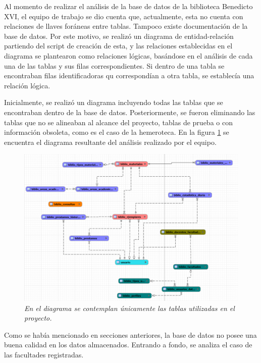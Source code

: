 \documentclass[spanish]{ieee_upb}
\begin{document}
Al momento de realizar el análisis de la base de datos de la biblioteca Benedicto XVI, el equipo de trabajo se dio cuenta que, actualmente, esta no cuenta con relaciones de llaves foráneas entre tablas. Tampoco existe documentación de la base de datos. Por este motivo, se realizó un diagrama de entidad-relación partiendo del script de creación de esta, y las relaciones establecidas en el diagrama se plantearon como relaciones lógicas, basándose en el análisis de cada una de las tablas y sus filas correspondientes. Si dentro de una tabla se encontraban filas identificadoras qu correspondían a otra tabla, se establecía una relación lógica.

\vspace{0.3cm}
Inicialmente, se realizó un diagrama incluyendo todas las tablas que se encontraban dentro de la base de datos. Posteriormente, se fueron eliminando las tablas que no se alineaban al alcance del proyecto, tablas de prueba o con información obsoleta, como es el caso de la hemeroteca. En la figura \ref{fig:entidad-relacion} se encuentra el diagrama resultante del análisis realizado por el equipo. 

\begin{figure}[H] 
	\centering
	\includegraphics[width=0.8\linewidth]{img/Diagramas/entidad-relacion.png}
	\vspace{-1mm}
	\caption[Diagrama de entidad-relación de la base de datos de la biblioteca Benedicto XVI]{\textit{En el diagrama se contemplan únicamente las tablas utilizadas en el proyecto.}}
	\label{fig:entidad-relacion} 
\end{figure}
 
\vspace{0.3cm}
Como se había mencionado en secciones anteriores, la base de datos no posee una buena calidad en los datos almacenados. Entrando a fondo, se analiza el caso de las facultades registradas. 
\end{document}
